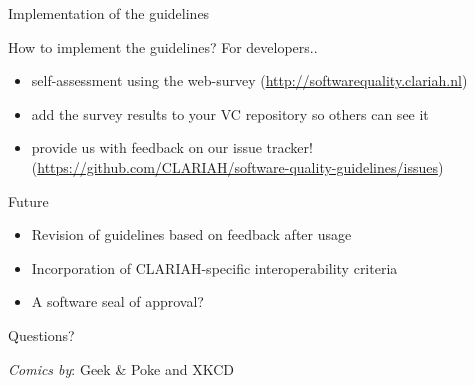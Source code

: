 \documentclass[compress]{beamer}
\begin{document}
\begin{frame}{Implementation of the guidelines}
    \begin{block}{How to implement the guidelines?}
        For developers..
        \begin{itemize}
            \item self-assessment using the web-survey (\url{http://softwarequality.clariah.nl})
            \item add the survey results to your VC repository so others can see it
            \item provide us with feedback on our issue tracker!
                (\url{https://github.com/CLARIAH/software-quality-guidelines/issues})
        \end{itemize}
    \end{block}

    \begin{block}{Future}
        \begin{itemize}
            \item Revision of guidelines based on feedback after usage
            \item Incorporation of CLARIAH-specific interoperability criteria
            \item A software seal of approval?
        \end{itemize}
    \end{block}
\end{frame}

\begin{frame}
\begin{center}

\Large{Questions?}

\vspace{1cm}

\emph{Comics by}: Geek \& Poke and XKCD


\end{center}

\end{frame}


\begin{frame}
\footnotesize


\end{frame}
\end{document}
